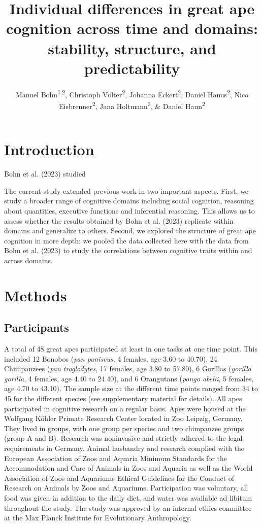 \documentclass[
  man,floatsintext]{apa6}
\title{Individual differences in great ape cognition across time and domains: stability, structure, and predictability}
\author{Manuel Bohn\textsuperscript{1,2}, Christoph Völter\textsuperscript{2}, Johanna Eckert\textsuperscript{2}, Daniel Hanus\textsuperscript{2}, Nico Eisbrenner\textsuperscript{2}, Jana Holtmann\textsuperscript{3}, \& Daniel Haun\textsuperscript{2}}
\date{}
\affiliation{\vspace{0.5cm}\textsuperscript{1} Institute of Psychology in Education, Leuphana University Lüneburg\\\textsuperscript{2} Department of Comparative Cultural Psychology, Max Planck Institute for Evolutionary Anthropology, Leipzig, Germany\\\textsuperscript{3} Wilhelm Wundt Institute of Psychology, Leipzig University, Leipzig, Germany}
\begin{document}
\maketitle

\hypertarget{introduction}{%
\section{Introduction}\label{introduction}}

Bohn et al. (2023) studied

The current study extended previous work in two important aspects. First, we study a broader range of cognitive domains including social cognition, reasoning about quantities, executive functions and inferential reasoning. This allows us to assess whether the results obtained by Bohn et al. (2023) replicate within domains and generalize to others. Second, we explored the structure of great ape cognition in more depth: we pooled the data collected here with the data from Bohn et al. (2023) to study the correlations between cognitive traits within and across domains.

\hypertarget{methods}{%
\section{Methods}\label{methods}}

\hypertarget{participants}{%
\subsection{Participants}\label{participants}}

A total of 48 great apes participated at least in one tasks at one time point. This included 12 Bonobos (\emph{pan paniscus}, 4 females, age 3.60 to 40.70), 24 Chimpanzees (\emph{pan troglodytes}, 17 females, age 3.80 to 57.80), 6 Gorillas (\emph{gorilla gorilla}, 4 females, age 4.40 to 24.40), and 6 Orangutans (\emph{pongo abelii}, 5 females, age 4.70 to 43.10). The sample size at the different time points ranged from 34 to 45 for the different species (see supplementary material for details). All apes participated in cognitive research on a regular basis. Apes were housed at the Wolfgang Köhler Primate Research Center located in Zoo Leipzig, Germany. They lived in groups, with one group per species and two chimpanzee groups (group A and B). Research was noninvasive and strictly adhered to the legal requirements in Germany. Animal husbandry and research complied with the European Association of Zoos and Aquaria Minimum Standards for the Accommodation and Care of Animals in Zoos and Aquaria as well as the World Association of Zoos and Aquariums Ethical Guidelines for the Conduct of Research on Animals by Zoos and Aquariums. Participation was voluntary, all food was given in addition to the daily diet, and water was available ad libitum throughout the study. The study was approved by an internal ethics committee at the Max Planck Institute for Evolutionary Anthropology.
\end{document}
